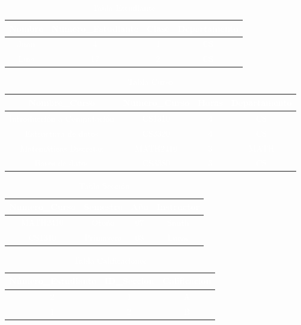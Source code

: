 \documentclass[a4paper,12pt]{article}
\begin{document}
\begin{table}[h]
    \centering
    \caption{\textcolor{white}{Tabla Estudiante}}
    \label{tabla_estudiante}
    \textcolor{white}{
    \begin{tabular}{|c|c|c|c|} 
    \hline
        Nombre & Numero\_Estudiante & Clase & Departamento \\ \hline
        Juan & 4 & 1 & CS \\ \hline
        Luis & 17 & 2 & CS \\ 
    \hline
    \end{tabular}
    }
\end{table}
\begin{table}[h]
    \centering
    \caption{\textcolor{white}{Tabla Curso}}
    \label{tabla_curso}
    \textcolor{white}{
    \begin{tabular}{|c|c|c|c|}
    \hline
    Nombre\_Curso & Numero\_Curso & Horas & Departamento \\
    \hline
        Introducción a Computación & CS1310 & 4 & CS \\
        Estructura de datos & CS3320 & 4 & CS \\
        Matemáticas Discretas & MATH2410 & 3 & MATH \\
        Bases de datos & CS3380 & 3 & CS \\
    \hline
    \end{tabular}
    }
\end{table}
\begin{table}[h]
    \centering
    \caption{\textcolor{white}{Tabla Sección}}
    \label{tabla_seccion}
    \textcolor{white}{
    \begin{tabular}{|c|c|c|c|}
    \hline
        Numero\_Curso & Semestre & Año & Instructor \\ \hline
        MATH2410 & Otoño & 07 & Smith \\
        CS1310 & Primavera & 08 & Lucas \\
    \hline
    \end{tabular}
    }
\end{table}
\begin{table}[h]
    \centering
    \caption{\textcolor{white}{Tabla Calificaciones}}
    \label{tabla_calificaciones}
    \textcolor{white}{
    \begin{tabular}{|c|c|c|}
    \hline
        Número\_Estudiante & ID\_Seccion & Calificacion \\ \hline
                2      &     1       & A \\
                1      &     2       & B \\
    \hline
    \end{tabular}
    }
\end{table}
\end{document}
